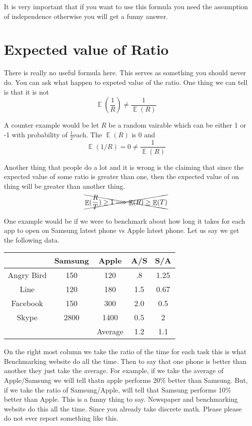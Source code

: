 \documentclass[a4paper, 12pt]{article}
\newcommand{\half}{\ensuremath{\frac{1}{2}}}
\DeclareMathOperator{\E}{\mathbb{E}}
\begin{document}
\begin{multicols}{2}
It is very important that if you want to use this formula you need the assumption of independence otherwise you will get a funny answer.

\section*{Expected value of Ratio}
There is really no useful formula here. This serves as something you should never do. You can ask what happen to expeted value of the ratio. One thing we can tell is that it is not
\[
	\E(\frac{1}{R}) \ne \frac{1}{\E(R)}
\]

A counter example would be let $R$ be a random vairable which can be either 1 or -1 with probability of \half each. The $\E(R)$ is 0 and
\[
	\E(1/R) = 0 \ne \frac{1}{\E(R)}
\]

Another thing that people do a lot and it is wrong is the claiming that since the expected value of some ratio is greater than one, then the expected value of on thing will be greater than another thing.
\[
	\xcancel{\E(\frac{R}{T}) \ge 1 \Longrightarrow \E(R) \ge \E(T)}
\]

One example would be if we were to benchmark about how long it takes for each app to open on Samsung latest phone vs Apple latest phone. Let us say we get the following data.
\begin{center}
	\begin{tabular}{c c c |c|c}
	& Samsung & Apple & A/S & S/A \\ 
	\hline\hline Angry Bird & 150 & 120 & .8 & 1.25 \\ 
	\hline Line & 120 & 180 & 1.5 & 0.67 \\ 
	\hline Facebook & 150 & 300 & 2.0 & 0.5 \\ 
	\hline Skype & 2800 & 1400 & 0.5 & 2 \\ 
	\hline\hline  &  & Average & 1.2 & 1.1
\end{tabular} 
\end{center}

On the right most column we take the ratio of the time for each task this is what Benchmarking website do all the time. Then to say that one phone is better than another they just take the average. For example, if we take the average of Apple/Samsung we will tell thatn apple performs 20\% better than Samsung. But, if we take the ratio of Samsung/Apple, will tell that Samsung performs 10\% better than Apple. This is a funny thing to say.  Newspaper and benchmarking website do this all the time. Since you already take discrete math. Please please do not ever report something like this.


\end{multicols}
\end{document}
